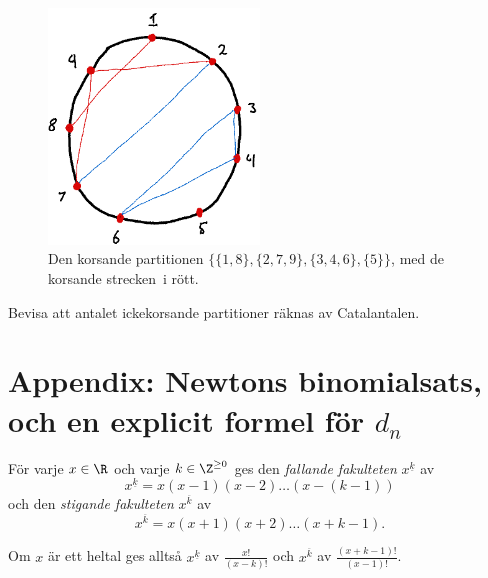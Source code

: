 \documentclass[nobib]{tufte-handout}
\begin{document}
\begin{xca}
    \begin{figure}
        \centering
        \includegraphics[width=0.5\textwidth]{graphics/crossing_partition.png}
        \caption{Den korsande partitionen $\{\{1,8\},\{2,7,9\},\{3,4,6\},\{5\}\}$, med de korsande strecken\, i rött.}
        \label{fig:crossing_partition}
    \end{figure}

    Bevisa att antalet ickekorsande partitioner räknas av Catalantalen.
\end{xca}

\newpage

\appendix

\section{Appendix: Newtons binomialsats, och en explicit formel för $d_n$}

\begin{definition}
    För varje $x\in \R$ och varje $k \in \Z^{\geq 0}$ ges den \emph{fallande fakulteten} $x^{\underline{k}}$ av
    $$x^{\underline{k}} = x(x-1)(x-2)\ldots(x-(k-1))$$
    och den \emph{stigande fakulteten} $x^{\overline{k}}$ av
    $$x^{\overline{k}} = x(x+1)(x+2)\ldots(x+k-1).$$

    Om $x$ är ett heltal ges alltså $x^{\underline{k}}$ av $\frac{x!}{(x-k)!}$ och $x^{\overline{k}}$ av $\frac{(x+k-1)!}{(x-1)!}$.
\end{definition}
\end{document}
